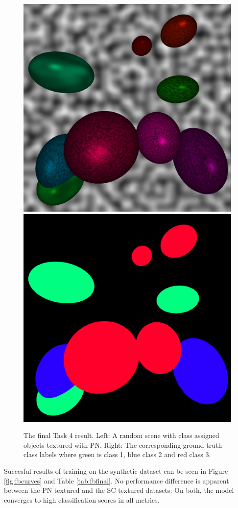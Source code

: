 \documentclass[12pt,fleqn]{article}
\begin{document}
\begin{figure}[H]
    \centering
        \includegraphics[width=0.49\linewidth]{t4-img}
        \includegraphics[width=0.49\linewidth]{t4-labelmap}
    \caption{
        The final Task 4 result.
        Left: A random scene with class assigned objects textured with PN. Right: The corresponding ground truth class labels where green is class 1, blue class 2 and red class 3.
    }
    \label{fig:t4}
\end{figure}\noindent
Succesful results of training on the synthetic dataset can be seen in Figure \ref{fig:fbcurves} and Table \ref{tab:fbfinal}.
No performance difference is apparent between the PN textured and the SC textured datasets: On both, the model converges to high classification scores in all metrics.
\end{document}
